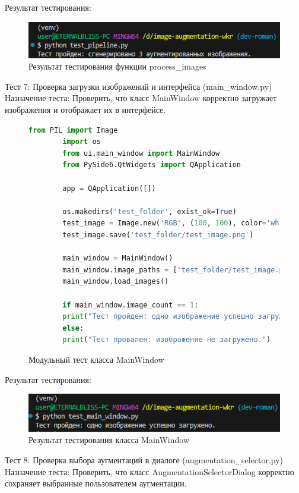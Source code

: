 Результат тестирования:
\begin{figure}[H]
	\centering
	\includegraphics[width=0.7\linewidth]{images/resulttest6}
	\caption{Результат тестирования функции process\_images}
	\label{fig:resulttest6}
\end{figure}

Тест 7: Проверка загрузки изображений и интерфейса (main\_window.py)
Назначение теста: Проверить, что класс MainWindow корректно загружает изображения и отображает их в интерфейсе.

\begin{figure}[H]
	\begin{lstlisting}[language=Python]
		from PIL import Image
		import os
		from ui.main_window import MainWindow
		from PySide6.QtWidgets import QApplication
		
		app = QApplication([])
		
		os.makedirs('test_folder', exist_ok=True)
		test_image = Image.new('RGB', (100, 100), color='white')
		test_image.save('test_folder/test_image.png')
		
		main_window = MainWindow()
		main_window.image_paths = ['test_folder/test_image.png']
		main_window.load_images()
		
		if main_window.image_count == 1:
		print("Тест пройден: одно изображение успешно загружено.")
		else:
		print("Тест провален: изображение не загружено.")
	\end{lstlisting}  
	\caption{Модульный тест класса MainWindow}
	\label{model_test:test7}
\end{figure}

Результат тестирования:
\begin{figure}[H]
	\centering
	\includegraphics[width=0.7\linewidth]{images/resulttest7}
	\caption{Результат тестирования класса MainWindow}
	\label{fig:resulttest7}
\end{figure}

Тест 8: Проверка выбора аугментаций в диалоге (augmentation\_selector.py)
Назначение теста: Проверить, что класс AugmentationSelectorDialog корректно сохраняет выбранные пользователем аугментации.


